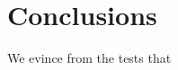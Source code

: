 \documentclass[dissertation.tex]{subfiles}
\begin{document}
\chapter{Conclusions}\label{cha:conclusions}
We evince from the tests that
\end{document}
